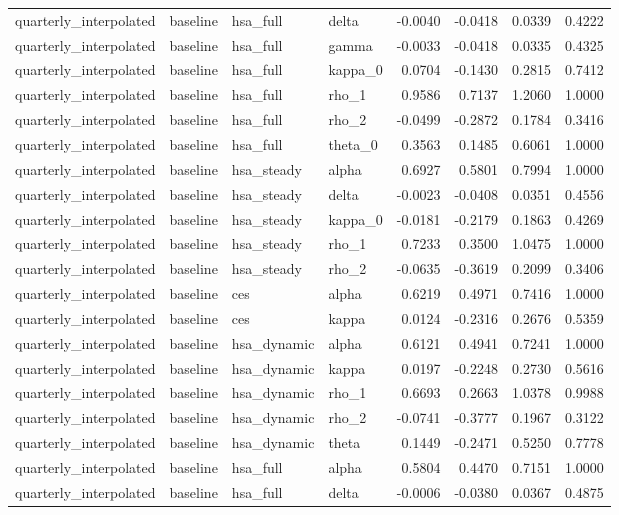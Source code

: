 \begin{tabular}{llllrrrr}
quarterly\_interpolated & baseline & hsa\_full & delta & -0.0040 & -0.0418 & 0.0339 & 0.4222 \\
quarterly\_interpolated & baseline & hsa\_full & gamma & -0.0033 & -0.0418 & 0.0335 & 0.4325 \\
quarterly\_interpolated & baseline & hsa\_full & kappa\_0 & 0.0704 & -0.1430 & 0.2815 & 0.7412 \\
quarterly\_interpolated & baseline & hsa\_full & rho\_1 & 0.9586 & 0.7137 & 1.2060 & 1.0000 \\
quarterly\_interpolated & baseline & hsa\_full & rho\_2 & -0.0499 & -0.2872 & 0.1784 & 0.3416 \\
quarterly\_interpolated & baseline & hsa\_full & theta\_0 & 0.3563 & 0.1485 & 0.6061 & 1.0000 \\
quarterly\_interpolated & baseline & hsa\_steady & alpha & 0.6927 & 0.5801 & 0.7994 & 1.0000 \\
quarterly\_interpolated & baseline & hsa\_steady & delta & -0.0023 & -0.0408 & 0.0351 & 0.4556 \\
quarterly\_interpolated & baseline & hsa\_steady & kappa\_0 & -0.0181 & -0.2179 & 0.1863 & 0.4269 \\
quarterly\_interpolated & baseline & hsa\_steady & rho\_1 & 0.7233 & 0.3500 & 1.0475 & 1.0000 \\
quarterly\_interpolated & baseline & hsa\_steady & rho\_2 & -0.0635 & -0.3619 & 0.2099 & 0.3406 \\
quarterly\_interpolated & baseline & ces & alpha & 0.6219 & 0.4971 & 0.7416 & 1.0000 \\
quarterly\_interpolated & baseline & ces & kappa & 0.0124 & -0.2316 & 0.2676 & 0.5359 \\
quarterly\_interpolated & baseline & hsa\_dynamic & alpha & 0.6121 & 0.4941 & 0.7241 & 1.0000 \\
quarterly\_interpolated & baseline & hsa\_dynamic & kappa & 0.0197 & -0.2248 & 0.2730 & 0.5616 \\
quarterly\_interpolated & baseline & hsa\_dynamic & rho\_1 & 0.6693 & 0.2663 & 1.0378 & 0.9988 \\
quarterly\_interpolated & baseline & hsa\_dynamic & rho\_2 & -0.0741 & -0.3777 & 0.1967 & 0.3122 \\
quarterly\_interpolated & baseline & hsa\_dynamic & theta & 0.1449 & -0.2471 & 0.5250 & 0.7778 \\
quarterly\_interpolated & baseline & hsa\_full & alpha & 0.5804 & 0.4470 & 0.7151 & 1.0000 \\
quarterly\_interpolated & baseline & hsa\_full & delta & -0.0006 & -0.0380 & 0.0367 & 0.4875 \\

\end{tabular}
